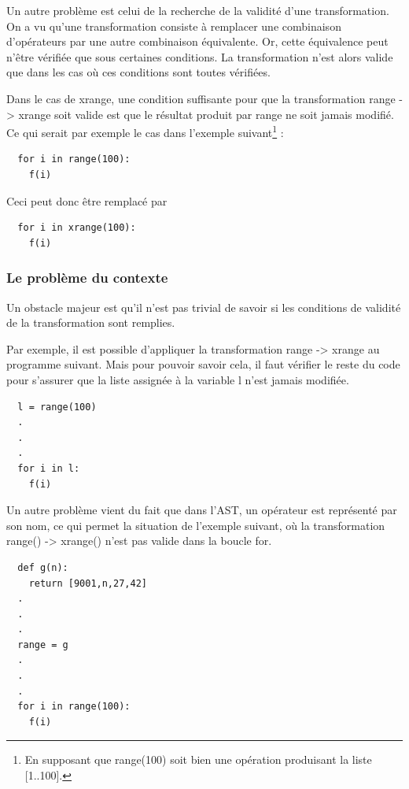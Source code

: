 \documentclass[a4paper]{article}
\begin{document}
Un autre problème est celui de la recherche de la validité d'une
transformation. On a vu qu'une transformation consiste à remplacer une
combinaison d'opérateurs par une autre combinaison équivalente. Or,
cette équivalence peut n'être vérifiée que sous certaines
conditions. La transformation n'est alors valide que dans les cas où
ces conditions sont toutes vérifiées.

Dans le cas de xrange, une condition suffisante pour que la
transformation range -> xrange soit valide est que le résultat produit
par range ne soit jamais modifié. Ce qui serait par exemple le cas
dans l'exemple suivant\footnote{En supposant que range(100) soit bien
  une opération produisant la liste [1..100].} :

\begin{verbatim}
  for i in range(100):
    f(i)
\end{verbatim}

Ceci peut donc être remplacé par

\begin{verbatim}
  for i in xrange(100):
    f(i)
\end{verbatim}

\subsubsection{Le problème du contexte}

Un obstacle majeur est qu'il n'est pas trivial de savoir si les
conditions de validité de la transformation sont remplies.

Par exemple, il est possible d'appliquer la transformation range ->
xrange au programme suivant. Mais pour pouvoir savoir cela, il faut
vérifier le reste du code pour s'assurer que la liste assignée à la
variable l n'est jamais modifiée.

\begin{verbatim}
  l = range(100)
  .
  .
  .
  for i in l:
    f(i)
\end{verbatim}

Un autre problème vient du fait que dans l'AST, un opérateur est
représenté par son nom, ce qui permet la situation de l'exemple
suivant, où la transformation range() -> xrange() n'est pas valide
dans la boucle for.

\begin{verbatim}
  def g(n):
    return [9001,n,27,42]
  .
  .
  .
  range = g
  .
  .
  .
  for i in range(100):
    f(i)
\end{verbatim}
\end{document}
